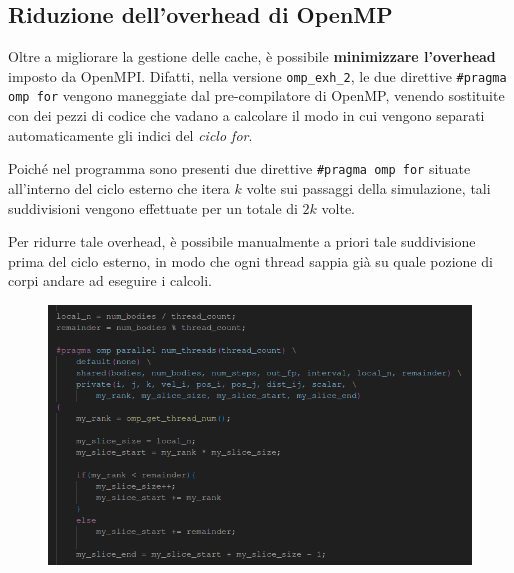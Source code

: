 \documentclass[12pt]{report}
\begin{document}
    \newpage
    
    \subsection{Riduzione dell'overhead di OpenMP}

    Oltre a migliorare la gestione delle cache, è possibile \textbf{minimizzare l'overhead} imposto da OpenMPI. Difatti, nella versione \texttt{omp\_exh\_2}, le due direttive \texttt{\#pragma omp for} vengono maneggiate dal pre-compilatore di OpenMP, venendo sostituite con dei pezzi di codice che vadano a calcolare il modo in cui vengono separati automaticamente gli indici del \textit{ciclo for}.

    Poiché nel programma sono presenti due direttive \texttt{\#pragma omp for} situate all'interno del ciclo esterno che itera $k$ volte sui passaggi della simulazione, tali suddivisioni vengono effettuate per un totale di $2k$ volte.

    Per ridurre tale overhead, è possibile manualmente a priori tale suddivisione prima del ciclo esterno, in modo che ogni thread sappia già su quale pozione di corpi andare ad eseguire i calcoli.
    
    \begin{figure}[H]
        \centering
        \includegraphics[width=\textwidth]{images/omp_exh_3_1.png}
    \end{figure}
\end{document}
